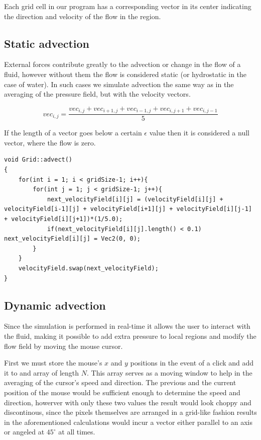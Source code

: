 \documentclass[12pt, titlepage]{article}
\begin{document}
Each grid cell in our program has a corresponding vector in its center indicating the direction and velocity of the flow in the region.

\subsection{Static advection}

External forces contribute greatly to the advection or change in the flow of a fluid, however without them the flow is considered static (or hydrostatic in the case of water). In such cases we simulate advection the same way as in the averaging of the pressure field, but with the velocity vectors.

\[
vec_{i,j} = \frac{vec_{i,j} + vec_{i+1,j} + vec_{i-1,j} + vec_{i,j+1} + vec_{i,j-1}}{5}
\]

If the length of a vector goes below a certain $\epsilon$ value then it is considered a null vector, where the flow is zero.

\begin{lstlisting}
void Grid::advect()
{
    for(int i = 1; i < gridSize-1; i++){
        for(int j = 1; j < gridSize-1; j++){
            next_velocityField[i][j] = (velocityField[i][j] + velocityField[i-1][j] + velocityField[i+1][j] + velocityField[i][j-1] + velocityField[i][j+1])*(1/5.0);
            if(next_velocityField[i][j].length() < 0.1) next_velocityField[i][j] = Vec2(0, 0);
        }
    }
    velocityField.swap(next_velocityField);
}
\end{lstlisting}

\subsection{Dynamic advection}

Since the simulation is performed in real-time it allows the user to interact with the fluid, making it possible to add extra pressure to local regions and modify the flow field by moving the mouse cursor.

\bigskip

First we must store the mouse's $x$ and $y$ positions in the event of a click and add it to and array of length $N$. This array serves as a moving window to help in the averaging of the cursor's speed and direction. The previous and the current position of the mouse would be sufficient enough to determine the speed and direction, howerver with only these two values the result would look choppy and discontinous, since the pixels themselves are arranged in a grid-like fashion results in the aforementioned calculations would incur a vector either parallel to an axis or angeled at $45^{\circ}$ at all times.
\end{document}
